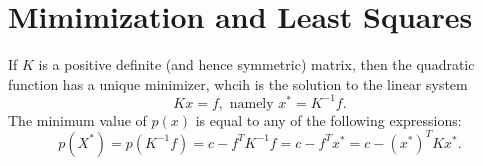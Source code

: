 \section{Mimimization and Least Squares}

\begin{theorem}
  If $K$ is a positive definite (and hence symmetric) matrix, then the quadratic function has a unique minimizer, whcih is the solution to the linear system 
  \[
  Kx=f,\text{ namely } x^{*}=K^{-1}f
.\] The minimum value of $p(x)$ is equal to any of the following expressions: \[
p(X^{*})=p(K^{-1}f)=c-f^{T}K^{-1}f=c-f^{T}x^{*}=c-(x^{*})^{T}Kx^{*}
.\] 
\end{theorem}
